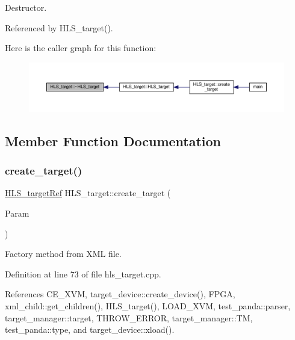 Destructor. 



Referenced by H\+L\+S\+\_\+target().

Here is the caller graph for this function\+:
\nopagebreak
\begin{figure}[H]
\begin{center}
\leavevmode
\includegraphics[width=350pt]{dd/dff/classHLS__target_a18e32dd957d5413eb4c05dc105ea5b91_icgraph}
\end{center}
\end{figure}


\subsection{Member Function Documentation}
\mbox{\label{classHLS__target_a08b0c129bed7fe1817fb47e52aeb5b86}} 
\subsubsection{\texorpdfstring{create\+\_\+target()}{create\_target()}}
{\footnotesize\ttfamily \hyperlink{hls__target_8hpp_a390f1d55d3b31739665ff2776abe2a3f}{H\+L\+S\+\_\+target\+Ref} H\+L\+S\+\_\+target\+::create\+\_\+target (\begin{DoxyParamCaption}\item[{const \hyperlink{Parameter_8hpp_a379beb25e5350c4c5585247ed50be3f9}{Parameter\+Ref} \&}]{Param }\end{DoxyParamCaption})\hspace{0.3cm}{\ttfamily [static]}}



Factory method from X\+ML file. 



Definition at line 73 of file hls\+\_\+target.\+cpp.



References C\+E\+\_\+\+X\+VM, target\+\_\+device\+::create\+\_\+device(), F\+P\+GA, xml\+\_\+child\+::get\+\_\+children(), H\+L\+S\+\_\+target(), L\+O\+A\+D\+\_\+\+X\+VM, test\+\_\+panda\+::parser, target\+\_\+manager\+::target, T\+H\+R\+O\+W\+\_\+\+E\+R\+R\+OR, target\+\_\+manager\+::\+TM, test\+\_\+panda\+::type, and target\+\_\+device\+::xload().



